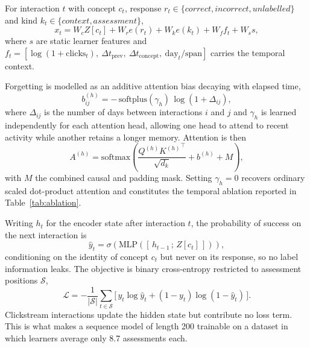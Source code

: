 For interaction $t$ with concept $c_t$, response
$r_t \in \{\textit{correct}, \textit{incorrect}, \textit{unlabelled}\}$ and kind
$k_t \in \{\textit{context}, \textit{assessment}\}$,
%
\begin{equation}
x_t = W_c Z[c_t] + W_r e(r_t) + W_k e(k_t) + W_f f_t + W_s s,
\label{eq:embedding}
\end{equation}
%
where $s$ are static learner features and
$f_t = [\log(1 + \text{clicks}_t),\ \Delta t_{\text{prev}},\
\Delta t_{\text{concept}},\ \text{day}_t/\text{span}]$ carries the temporal context.

Forgetting is modelled as an additive attention bias decaying with elapsed time,
%
\begin{equation}
b^{(h)}_{ij} = -\,\mathrm{softplus}(\gamma_h)\,\log\!\left(1 + \Delta_{ij}\right),
\label{eq:decay}
\end{equation}
%
where $\Delta_{ij}$ is the number of days between interactions $i$ and $j$ and
$\gamma_h$ is learned independently for each attention head, allowing one head to
attend to recent activity while another retains a longer memory. Attention is then
%
\begin{equation}
A^{(h)} = \mathrm{softmax}\!\left(
\frac{Q^{(h)} {K^{(h)}}^{\!\top}}{\sqrt{d_k}} + b^{(h)} + M\right),
\label{eq:attention}
\end{equation}
%
with $M$ the combined causal and padding mask. Setting $\gamma_h = 0$ recovers
ordinary scaled dot-product attention and constitutes the temporal ablation reported
in Table~\ref{tab:ablation}.

Writing $h_t$ for the encoder state after interaction $t$, the probability of success
on the next interaction is
%
\begin{equation}
\hat{y}_t = \sigma\!\left(\mathrm{MLP}\!\left(\left[\,h_{t-1}\,;\,Z[c_t]\,\right]\right)\right),
\label{eq:prediction}
\end{equation}
%
conditioning on the identity of concept $c_t$ but never on its response, so no label
information leaks. The objective is binary cross-entropy restricted to assessment
positions $\mathcal{S}$,
%
\begin{equation}
\mathcal{L} = -\frac{1}{|\mathcal{S}|}\sum_{t \in \mathcal{S}}
\Big[\,y_t \log \hat{y}_t + (1-y_t)\log(1-\hat{y}_t)\,\Big].
\label{eq:loss}
\end{equation}
%
Clickstream interactions update the hidden state but contribute no loss term. This is
what makes a sequence model of length 200 trainable on a dataset in which learners
average only 8.7 assessments each.

